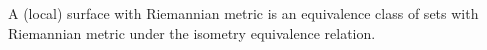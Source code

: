 A (local) surface with Riemannian metric is an equivalence class of sets with Riemannian metric under the isometry equivalence relation.
